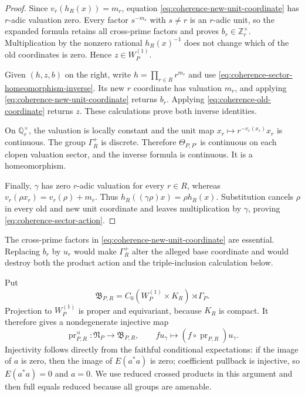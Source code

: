 \begin{proof}
Since $v_r(h_R(x))=m_r$, equation
\eqref{eq:coherence-new-unit-coordinate} has $r$-adic valuation zero.
Every factor $s^{-m_s}$ with $s\ne r$ is an $r$-adic unit, so the expanded
formula retains all cross-prime factors and proves $b_r\in\mathbb Z_r^\times$.
Multiplication by the nonzero rational $h_R(x)^{-1}$ does not change which of
the old coordinates is zero.  Hence $z\in W_P^{(1)}$.

Given $(h,z,b)$ on the right, write $h=\prod_{r\in R}r^{m_r}$ and use
\eqref{eq:coherence-sector-homeomorphism-inverse}.  Its new $r$ coordinate
has valuation $m_r$, and applying
\eqref{eq:coherence-new-unit-coordinate} returns $b_r$.  Applying
\eqref{eq:coherence-old-coordinate} returns $z$.  These calculations prove
both inverse identities.

On $\mathbb Q_r^\times$, the valuation is locally constant and the unit map
$x_r\mapsto r^{-v_r(x_r)}x_r$ is continuous.  The group
$\Gamma_R^+$ is discrete.  Therefore $\Theta_{P,P'}$ is continuous on each
clopen valuation sector, and the inverse formula is continuous.  It is a
homeomorphism.

Finally, $\gamma$ has zero $r$-adic valuation for every $r\in R$, whereas
$v_r(\rho x_r)=v_r(\rho)+m_r$.  Thus
$h_R((\gamma\rho)x)=\rho h_R(x)$.  Substitution cancels $\rho$ in every
old and new unit coordinate and leaves multiplication by $\gamma$, proving
\eqref{eq:coherence-sector-action}.
\end{proof}

The cross-prime factors in
\eqref{eq:coherence-new-unit-coordinate} are essential.  Replacing $b_r$ by
$u_r$ would make $\Gamma_R^+$ alter the alleged base coordinate and would
destroy both the product action and the triple-inclusion calculation below.

Put
\[
 \mathfrak B_{P,R}
 =C_0(W_P^{(1)}\times K_R)\rtimes\Gamma_P.
\]
Projection to $W_P^{(1)}$ is proper and equivariant, because $K_R$ is
compact.  It therefore gives a nondegenerate injective map
\begin{equation}
 \operatorname{pr}_{P,R}^{\rtimes}:\mathfrak N_P\longrightarrow
 \mathfrak B_{P,R},\qquad
 fu_\gamma\longmapsto(f\circ\operatorname{pr}_{P,R})u_\gamma.
 \label{eq:coherence-projection-crossed-product-map}
\end{equation}
Injectivity follows directly from the faithful conditional expectations:
if the image of $a$ is zero, then the image of $E(a^*a)$ is zero; coefficient
pullback is injective, so $E(a^*a)=0$ and $a=0$.  We use reduced crossed
products in this argument and then full equals reduced because all groups are
amenable.

